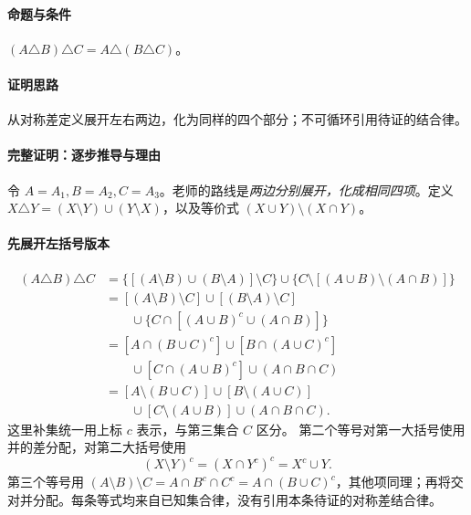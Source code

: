 \paragraph{命题与条件}$(A\triangle B)\triangle C=A\triangle(B\triangle C)$。
\paragraph{证明思路}从对称差定义展开左右两边，化为同样的四个部分；不可循环引用待证的结合律。
\paragraph{完整证明：逐步推导与理由}

令 $A=A_1,B=A_2,C=A_3$。老师的路线是\emph{两边分别展开，化成相同四项}。定义 $X\triangle Y=(X\setminus Y)\cup(Y\setminus X)$，以及等价式 $(X\cup Y)\setminus(X\cap Y)$。
\paragraph{先展开左括号版本}
\begin{align*}
(A\triangle B)\triangle C
&=\{[(A\setminus B)\cup(B\setminus A)]\setminus C\}
 \cup\{C\setminus[(A\cup B)\setminus(A\cap B)]\}\\
&=[(A\setminus B)\setminus C]\cup[(B\setminus A)\setminus C]\\
&\qquad\cup\{C\cap[(A\cup B)^c\cup(A\cap B)]\}\\
&=[A\cap (B\cup C)^c]\cup[B\cap (A\cup C)^c]\\
&\qquad\cup[C\cap (A\cup B)^c]\cup(A\cap B\cap C)\\
&=[A\setminus(B\cup C)]\cup[B\setminus(A\cup C)]\\
&\qquad\cup[C\setminus(A\cup B)]\cup(A\cap B\cap C).
\end{align*}
这里补集统一用上标 $c$ 表示，与第三集合 $C$ 区分。
第二个等号对第一大括号使用并的差分配，对第二大括号使用
\[(X\setminus Y)^c=(X\cap Y^c)^c=X^c\cup Y.\]
第三个等号用 $(A\setminus B)\setminus C=A\cap B^c\cap C^c=A\cap (B\cup C)^c$，其他项同理；再将交对并分配。每条等式均来自已知集合律，没有引用本条待证的对称差结合律。

